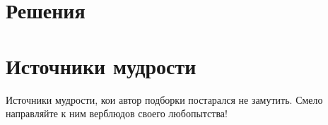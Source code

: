 \documentclass[nobib]{tufte-handout}
\theoremstyle{definition}
\newcounter{problem}
\begin{document}



\section{Решения}


\renewenvironment{solution}[1]{%
         \vskip .5cm plus 2cm minus 0.1cm%
         {\bfseries \hyperlink{problem:#1}{#1.}}%
}%
{%
}%






\section{Источники мудрости}

Источники мудрости, кои автор подборки постарался не замутить.
Смело направляйте к ним верблюдов своего любопытства!

\nocite{*}

\printbibliography
\end{document}
